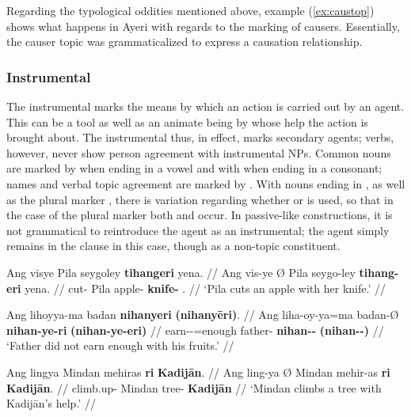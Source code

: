 Regarding the typological oddities mentioned above, example (\ref{ex:caustop}) 
shows what happens in Ayeri with regards to the marking of causers. 
Essentially, the causer topic was grammaticalized to express a causation 
relationship.


\subsubsection{Instrumental}
\label{subsubsec:instrumental}

The instrumental marks the means by which an action is carried out by an agent. 
This can be a tool as well as an animate being by whose help the action is 
brought about. The instrumental thus, in effect, marks secondary agents; verbs, 
however, never show person agreement with instrumental NPs. Common nouns are 
marked by  when ending in a vowel and with  
when ending in a consonant; names and verbal topic agreement are marked by 
. With nouns ending in , as well as the plural marker 
, there is variation regarding whether  or 
 is used, so that in the case of the plural marker both 
 and  occur. In passive-like 
constructions, it is not grammatical to reintroduce the agent as an 
instrumental; the agent simply remains in the clause in this case, though as a 
non-topic constituent.

\pex
\a\begingl
	\gla Ang visye {} Pila seygoley \textbf{tihangeri} yena. //
	\glb Ang vis-ye Ø Pila seygo-ley \textbf{tihang-eri} yena. //
	\glc \AgtT{} cut-\TsgF{} \Top{} Pila apple-\PargI{} 
		\textbf{knife-\Ins{}} \TsgF{}.\Gen{} //
	\glft `Pila cuts an apple with her knife.' //
\endgl

\a\begingl
	\gla Ang lihoyya-ma badan \textbf{nihanyeri} \textbf{(nihanyēri)}. //
	\glb Ang liha-oy-ya=ma badan-Ø \textbf{nihan-ye-ri} 
		\textbf{(nihan-ye-eri)} //
	\glc \AgtT{} earn-\Neg{}-\TsgM{}=enough father-\Top{} 
		\textbf{nihan-\Pl{}-\Ins} \textbf{(nihan-\Pl{}-\Ins)} //
	\glft `Father did not earn enough with his fruits.' //
\endgl

\a\begingl
	\gla Ang lingya {} Mindan mehiras \textbf{ri} \textbf{Kadijān}. //
	\glb Ang ling-ya Ø Mindan mehir-as \textbf{ri} \textbf{Kadijān}. //
	\glc \AgtT{} climb.up-\TsgM{} \Top{} Mindan tree-\Parg{} 
		\textbf{\Ins{}} \textbf{Kadijān} //
	\glft `Mindan climbs a tree with Kadijān's help.' //
\endgl

